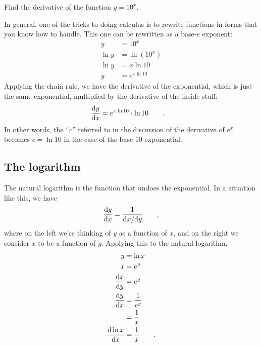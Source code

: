 \begin{eg}
\egquestion Find the derivative of the function $y=10^x$.

\eganswer In general, one of the tricks to doing calculus is to rewrite functions in forms that
you know how to handle. This one can be rewritten as a base-$e$ exponent:
\begin{align*}
  y &= 10^x \\
  \ln y &= \ln\left(10^x\right) \\
  \ln y &= x \ln 10 \\
  y &= e^{x\ln 10}
\end{align*}
Applying the chain rule, we have the derivative of the exponential, which is just the same
exponential, multiplied by the derivative of the inside stuff:
\begin{align*}
  \frac{\textup{d} y}{\textup{d} x} &= e^{x\ln 10} \cdot \ln 10 \qquad .
\end{align*}
In other words, the ``$c$'' referred to in the discussion of the derivative of $e^x$ becomes
$c=\ln 10$ in the case of the base-10 exponential.
\end{eg}

\subsection{The logarithm}

The natural logarithm is the function that undoes the exponential. In a situation like this, we
have
\begin{equation*}
  \frac{\textup{d} y}{\textup{d} x} = \frac{1}{\textup{d} x/\textup{d} y} \qquad ,
\end{equation*}
where on the left we're thinking of $y$ as a function of $x$, and on the right we consider
$x$ to be a function of $y$. Applying this to the natural logarithm,
\begin{align*}
  y &= \ln x \\
  x &= e^y \\
  \frac{\textup{d} x}{\textup{d} y} &= e^y \\
  \frac{\textup{d} y}{\textup{d} x} &= \frac{1}{e^y} \\
                        & = \frac{1}{x} \\
  \frac{\textup{d} \ln x}{\textup{d} x} &= \frac{1}{x} \qquad .
\end{align*}

